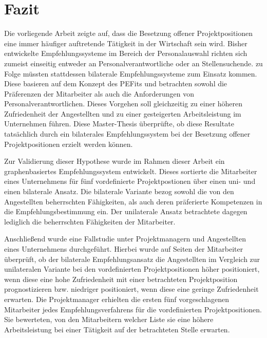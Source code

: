 \chapter{Fazit}
\label{ch:fazit}
Die vorliegende Arbeit zeigte auf, dass die Besetzung offener Projektpositionen eine immer häufiger auftretende Tätigkeit in der Wirtschaft sein wird. Bisher entwickelte Empfehlungssysteme im Bereich der Personalauswahl richten sich zumeist einseitig entweder an Personalverantwortliche oder an Stellensuchende. \textcite[S. 1ff.]{malinowski:2006} zu Folge müssten stattdessen bilaterale Empfehlungssysteme zum Einsatz kommen. Diese basieren auf dem Konzept des \aclp{PEFit} und betrachten sowohl die Präferenzen der Mitarbeiter als auch die Anforderungen von Personalverantwortlichen. Dieses Vorgehen soll gleichzeitig zu einer höheren Zufriedenheit der Angestellten und zu einer gesteigerten Arbeitsleistung im Unternehmen führen. Diese Master-Thesis überprüfte, ob diese Resultate tatsächlich durch ein bilaterales Empfehlungssystem bei der Besetzung offener Projektpositionen erzielt werden können.

Zur Validierung dieser Hypothese wurde im Rahmen dieser Arbeit ein graphenbasiertes Empfehlungssystem entwickelt. Dieses sortierte die Mitarbeiter eines Unternehmens für fünf vordefinierte Projektpostionen über einen uni- und einen bilaterale Ansatz. Die bilaterale Variante bezog sowohl die von den Angestellten beherrschten Fähigkeiten, als auch deren präferierte Kompetenzen in die Empfehlungsbestimmung ein. Der unilaterale Ansatz betrachtete dagegen lediglich die beherrschten Fähigkeiten der Mitarbeiter.

Anschließend wurde eine Fallstudie unter Projektmanagern und Angestellten eines Unternehmens durchgeführt. Hierbei wurde auf Seiten der Mitarbeiter überprüft, ob der bilaterale Empfehlungsansatz die Angestellten im Vergleich zur unilateralen Variante bei den vordefinierten Projektpositionen höher positioniert, wenn diese eine hohe Zufriedenheit mit einer betrachteten Projektposition prognostizieren bzw. niedriger positioniert, wenn diese eine geringe Zufriedenheit erwarten. Die Projektmanager erhielten die ersten fünf vorgeschlagenen Mitarbeiter jedes Empfehlungsverfahrens für die vordefinierten Projektpositionen. Sie bewerteten, von den Mitarbeitern welcher Liste sie eine höhere Arbeitsleistung bei einer Tätigkeit auf der betrachteten Stelle erwarten.

